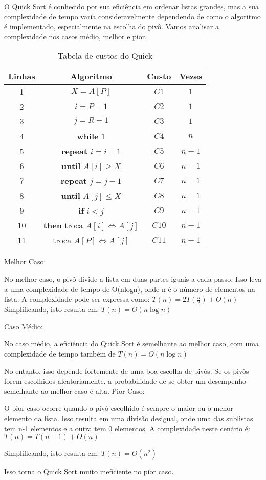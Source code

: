 O Quick Sort é conhecido por sua eficiência em ordenar listas grandes, mas a sua complexidade de tempo varia consideravelmente dependendo de como o algoritmo é implementado, especialmente na escolha do pivô. Vamos analisar a complexidade nos casos médio, melhor e pior\cite{devto_quick_sort}.

\begin{table}[htbp]
\centering
\begin{tabular}{|c|c|c|c|}
\hline
Linhas & Algoritmo & Custo & Vezes \\
\hline
1 & $X = A[P]$ & $C1$ & $1$ \\
2 & $i = P-1$ & $C2$ & $1$ \\
3 & $j = R-1$ & $C3$ & $1$ \\
4 & \textbf{while} $1$ & $C4$ & $n$ \\
5 & \textbf{repeat} $i = i+1$ & $C5$ & $n-1$ \\
6 & \textbf{until} $A[i] \geq X$ & $C6$ & $n-1$ \\
7 & \textbf{repeat} $j = j -1$ & $C7$ & $n-1$ \\
8 & \textbf{until} $A[j] \leq X$ & $C8$ & $n-1$ \\
9 & \textbf{if} $i < j$ & $C9$ & $n-1$ \\
10 & \textbf{then} troca $A[i] \Leftrightarrow A[j]$ & $C10$ & $n-1$ \\
11 & troca $A[P] \Leftrightarrow A[j]$ & $C11$ & $n-1$ \\
\hline
\end{tabular}
\caption{Tabela de custos do Quick}
\end{table}


Melhor Caso:

No melhor caso, o pivô divide a lista em duas partes iguais a cada passo. Isso leva a uma complexidade de tempo de O(nlogn), onde n é o número de elementos na lista.
A complexidade pode ser expressa como:
$T(n) = 2T\left(\frac{n}{2}\right) + O(n)$
Simplificando, isto resulta em:
$T(n) = O(n \log n)$


Caso Médio:

No caso médio, a eficiência do Quick Sort é semelhante ao melhor caso, com uma complexidade de tempo também de 
$T(n) = O(n \log n)$


No entanto, isso depende fortemente de uma boa escolha de pivôs. Se os pivôs forem escolhidos aleatoriamente, a probabilidade de se obter um desempenho semelhante ao melhor caso é alta.
Pior Caso:

O pior caso ocorre quando o pivô escolhido é sempre o maior ou o menor elemento da lista. Isso resulta em uma divisão desigual, onde uma das sublistas tem n-1 elementos e a outra tem 0 elementos.
A complexidade neste cenário é:
$T(n) = T(n-1) + O(n)$


Simplificando, isto resulta em:
$T(n) = O(n^2)$


Isso torna o Quick Sort muito ineficiente no pior caso.